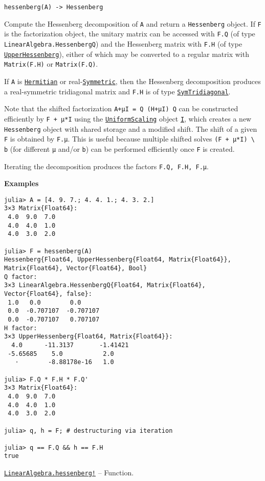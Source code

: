 \begin{adjustwidth}{2em}{0pt}


\begin{verbatim}
hessenberg(A) -> Hessenberg
\end{verbatim}

Compute the Hessenberg decomposition of \texttt{A} and return a \texttt{Hessenberg} object. If \texttt{F} is the factorization object, the unitary matrix can be accessed with \texttt{F.Q} (of type \texttt{LinearAlgebra.HessenbergQ}) and the Hessenberg matrix with \texttt{F.H} (of type \hyperlink{6167777885202579792}{\texttt{UpperHessenberg}}), either of which may be converted to a regular matrix with \texttt{Matrix(F.H)} or \texttt{Matrix(F.Q)}.

If \texttt{A} is \hyperlink{938713992181310063}{\texttt{Hermitian}} or real-\hyperlink{17683454167504168761}{\texttt{Symmetric}}, then the Hessenberg decomposition produces a real-symmetric tridiagonal matrix and \texttt{F.H} is of type \hyperlink{6062797780727203318}{\texttt{SymTridiagonal}}.

Note that the shifted factorization \texttt{A+μI = Q (H+μI) Q{\textquotesingle}} can be constructed efficiently by \texttt{F + μ*I} using the \hyperlink{723087258311673942}{\texttt{UniformScaling}} object \hyperlink{15346645596018210602}{\texttt{I}}, which creates a new \texttt{Hessenberg} object with shared storage and a modified shift.   The shift of a given \texttt{F} is obtained by \texttt{F.μ}. This is useful because multiple shifted solves \texttt{(F + μ*I) {\textbackslash} b} (for different \texttt{μ} and/or \texttt{b}) can be performed efficiently once \texttt{F} is created.

Iterating the decomposition produces the factors \texttt{F.Q, F.H, F.μ}.

\textbf{Examples}


\begin{verbatim}
julia> A = [4. 9. 7.; 4. 4. 1.; 4. 3. 2.]
3×3 Matrix{Float64}:
 4.0  9.0  7.0
 4.0  4.0  1.0
 4.0  3.0  2.0

julia> F = hessenberg(A)
Hessenberg{Float64, UpperHessenberg{Float64, Matrix{Float64}}, Matrix{Float64}, Vector{Float64}, Bool}
Q factor:
3×3 LinearAlgebra.HessenbergQ{Float64, Matrix{Float64}, Vector{Float64}, false}:
 1.0   0.0        0.0
 0.0  -0.707107  -0.707107
 0.0  -0.707107   0.707107
H factor:
3×3 UpperHessenberg{Float64, Matrix{Float64}}:
  4.0      -11.3137       -1.41421
 -5.65685    5.0           2.0
   ⋅        -8.88178e-16   1.0

julia> F.Q * F.H * F.Q'
3×3 Matrix{Float64}:
 4.0  9.0  7.0
 4.0  4.0  1.0
 4.0  3.0  2.0

julia> q, h = F; # destructuring via iteration

julia> q == F.Q && h == F.H
true
\end{verbatim}



\end{adjustwidth}
\hypertarget{6911141030439555603}{}
\hyperlink{6911141030439555603}{\texttt{LinearAlgebra.hessenberg!}}  -- {Function.}

